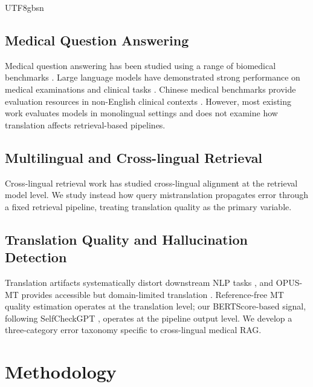 \documentclass[11pt]{article}
\begin{document}
\begin{CJK}{UTF8}{gbsn}
\subsection{Medical Question Answering}
Medical question answering has been studied using a range of biomedical benchmarks \cite{jin-etal-2019-pubmedqa, tsatsaronis2012bioasq}. Large language models have demonstrated strong performance on medical examinations and clinical tasks \cite{thirunavukarasu2023large, achiam2023gpt}. Chinese medical benchmarks provide evaluation resources in non-English clinical contexts \cite{wang-etal-2024-cmb}. However, most existing work evaluates models in monolingual settings and does not examine how translation affects retrieval-based pipelines.

\subsection{Multilingual and Cross-lingual Retrieval}
Cross-lingual retrieval work \cite{nie2010cross,longpre2021mkqa,asai2021xor,zhang-etal-2021-mr,nie2023cross} has studied cross-lingual alignment at the retrieval model level. We study instead how query mistranslation propagates error through a fixed retrieval pipeline, treating translation quality as the primary variable.

\subsection{Translation Quality and Hallucination Detection}
Translation artifacts systematically distort downstream NLP tasks \cite{artetxe2020translation, guerreiro2023hallucinations}, and OPUS-MT provides accessible but domain-limited translation \cite{tiedemann-thottingal-2020-opus}. Reference-free MT quality estimation \cite{rei2020comet, ranasinghe2020transquest} operates at the translation level; our BERTScore-based signal, following SelfCheckGPT \cite{manakul-etal-2023-selfcheckgpt}, operates at the pipeline output level. We develop a three-category error taxonomy specific to cross-lingual medical RAG.


\section{Methodology}

\end{CJK}
\end{document}
